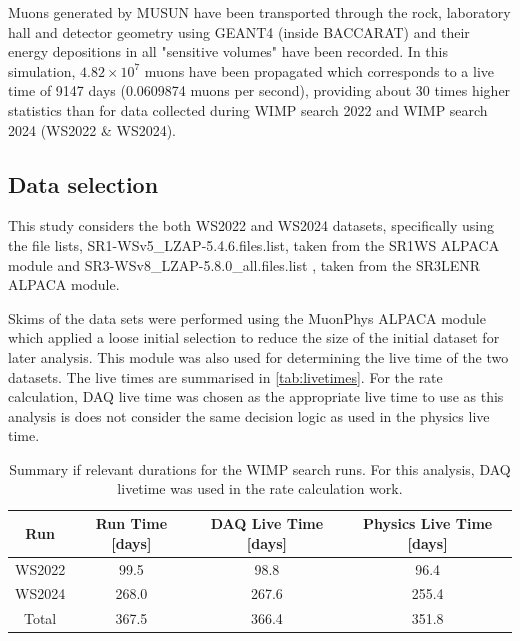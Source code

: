 \par Muons generated by MUSUN have been transported through the rock, laboratory hall and detector geometry using GEANT4 (inside BACCARAT) and their energy depositions in all "sensitive volumes" have been recorded. In this simulation, $4.82\times10^7$ muons have been propagated which corresponds to a live time of 9147 days (0.0609874 muons per second), providing about 30 times higher statistics than for data collected during WIMP search 2022 and WIMP search 2024 (WS2022 \& WS2024).

\subsection{Data selection}
This study considers the both WS2022 and WS2024 datasets, specifically using the file lists, {\selectfont SR1-WSv5\_LZAP-5.4.6.files.list}, taken from the {\selectfont SR1WS} ALPACA module and {\selectfont SR3-WSv8\_LZAP-5.8.0\_all.files.list }, taken from the {\selectfont SR3LENR} ALPACA module. 

Skims of the data sets were performed using the {\selectfont MuonPhys} ALPACA module which applied a loose initial selection to reduce the size of the initial dataset for later analysis. This module was also used for determining the live time of the two datasets. The live times are summarised in \autoref{tab:livetimes}. For the rate calculation, DAQ live time was chosen as the appropriate live time to use as this analysis is does not consider the same decision logic as used in the physics live time.

\begin{table}[htbp]
    \centering
    \caption{Summary if relevant durations for the WIMP search runs. For this analysis, DAQ livetime was used in the rate calculation work.}
    \begin{tabular}{|c|c|c|c|}
        \hline
        \textbf{Run} & \textbf{Run Time [days]} & \textbf{DAQ Live Time [days]} & \textbf{Physics Live Time [days]} \\
        \hline
        WS2022 & 99.5 & 98.8 & 96.4 \\
        WS2024 & 268.0 & 267.6 & 255.4 \\
        Total & 367.5 & 366.4 & 351.8 \\
        \hline
    \end{tabular}
    \label{tab:livetimes}
\end{table}

